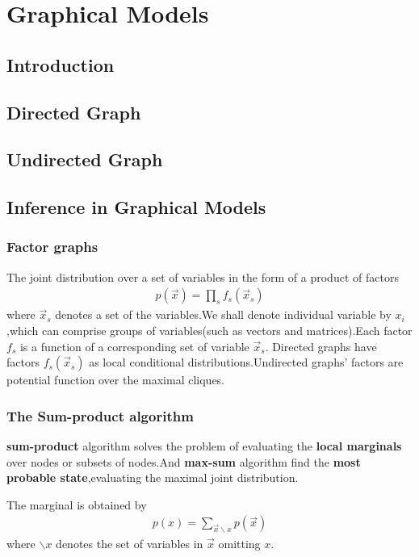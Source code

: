 \chapter{Graphical Models}
\label{chap:Graphical Models}

\section{Introduction}

\section{Directed Graph}

\section{Undirected Graph}

\section{Inference in Graphical Models}
\subsection{Factor graphs}
The joint distribution over a set of variables in the form of a product of factors
\begin{align}
p(\vec{x}) = \prod_s f_s(\vec{x}_s)
\end{align}
where $\vec{x}_s$ denotes a set of the variables.We shall denote individual variable by $x_i$,which can comprise groups of variables(such as vectors and matrices).Each factor $f_s$ is a function of a corresponding set of variable $\vec{x}_s$.
Directed graphs have factors $f_s(\vec{x}_s)$ as local conditional distributions.Undirected graphs' factors are potential function over the maximal cliques.

\subsection{The Sum-product algorithm}
\textbf{sum-product} algorithm solves the problem of evaluating the \textbf{local marginals} over nodes or subsets of nodes.And \textbf{max-sum} algorithm find the \textbf{most probable state},evaluating the maximal joint distribution.

The marginal is obtained by
\begin{align}
p(x) = \sum_{\vec{x}\backslash x}{p(\vec{x})}
\end{align}
where $\backslash x$ denotes the set of variables in $\vec{x}$ omitting $x$.


